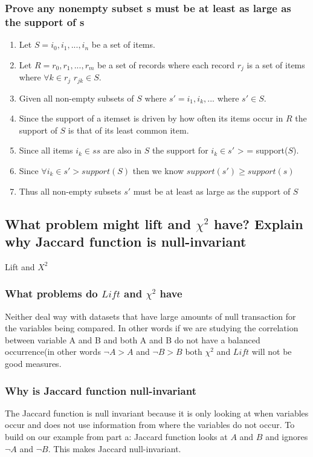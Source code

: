 \documentclass[11pt]{article}
\begin{document}
\subsubsection{Prove any nonempty subset s must be at least as large as the support of s}
\begin{enumerate}
    \item Let $S = {i_0, i_1,..., i_n}$ be a set of items.
    \item Let $R = {r_0, r_1, ...,r_m}$ be a set of records where each record $r_j$ is a set of items where $\forall k \in r_j$ $r_{jk} \in S$.
    \item Given all non-empty subsets of $S$ where $s' = {i_1, i_k, ...}$ where $s' \in S$.
    \item Since the support of a itemset is driven by how often its items occur in $R$ the support of $S$ is that of its least common item. 
    \item Since all items $i_k \in ss$ are also in $S$ the support for $i_k \in s'$ > = support($S$).
    \item Since $\forall i_k \in s'> support(S)$ then we know $support(s') \ge support(s)$
    \item Thus all non-empty subsets $s'$ must be at least as large as the support of $S$
\end{enumerate}
\subsection{What problem might lift and $\chi^2$ have? Explain why Jaccard function is null-invariant}
Lift and $X^2$
\subsubsection{What problems do $Lift$ and $\chi^2$ have}
Neither deal way with datasets that have large amounts of null transaction for the variables being compared. In other words if we are studying the correlation between variable A and B and both A and B do not have a balanced occurrence(in other words $\neg A > A$ and $\neg B > B$ both $\chi^2$ and $Lift$ will not be good measures.
\subsubsection{Why is Jaccard function null-invariant}
The Jaccard function is null invariant because it is only looking at when variables occur and does not use information from where the variables do not occur. To build on our example from part a: Jaccard function looks at $A$ and $B$ and ignores $\neg A$ and $\neg B$. This makes Jaccard null-invariant.
\end{document}
